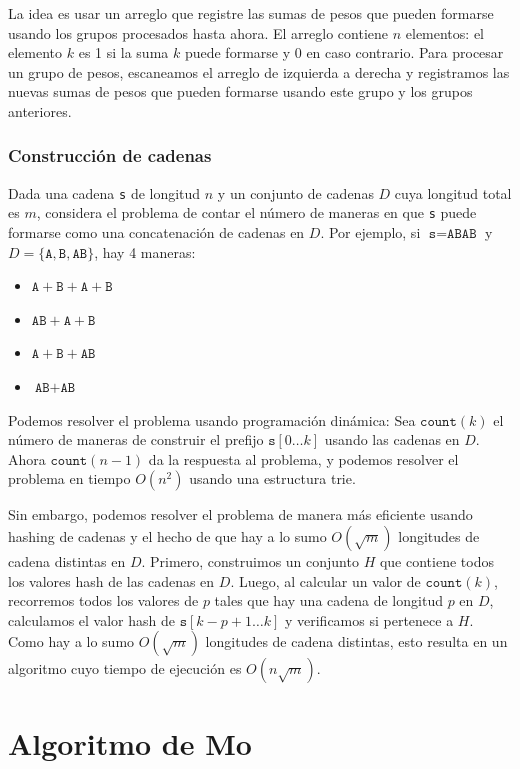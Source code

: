 La idea es usar un arreglo que registre las sumas de pesos
que pueden formarse usando los grupos procesados hasta ahora.
El arreglo contiene $n$ elementos: el elemento $k$ es 1 si la suma
$k$ puede formarse y 0 en caso contrario.
Para procesar un grupo de pesos, escaneamos el arreglo
de izquierda a derecha y registramos las nuevas sumas de pesos que
pueden formarse usando este grupo y los grupos anteriores.

\subsubsection{Construcción de cadenas}

Dada una cadena \texttt{s} de longitud $n$
y un conjunto de cadenas $D$ cuya longitud total es $m$,
considera el problema de contar el número de maneras
en que \texttt{s} puede formarse como una concatenación de cadenas en $D$.
Por ejemplo,
si $\texttt{s}=\texttt{ABAB}$ y
$D=\{\texttt{A},\texttt{B},\texttt{AB}\}$,
hay 4 maneras:

\begin{itemize}[noitemsep]
\item $\texttt{A}+\texttt{B}+\texttt{A}+\texttt{B}$
\item $\texttt{AB}+\texttt{A}+\texttt{B}$
\item $\texttt{A}+\texttt{B}+\texttt{AB}$
\item $\texttt{AB}+\texttt{AB}$
\end{itemize}

Podemos resolver el problema usando programación dinámica:
Sea $\texttt{count}(k)$ el número de maneras de construir el prefijo
$\texttt{s}[0 \ldots k]$ usando las cadenas en $D$.
Ahora $\texttt{count}(n-1)$ da la respuesta al problema,
y podemos resolver el problema en tiempo $O(n^2)$
usando una estructura trie.

Sin embargo, podemos resolver el problema de manera más eficiente
usando hashing de cadenas y el hecho de que hay
a lo sumo $O(\sqrt m)$ longitudes de cadena distintas en $D$.
Primero, construimos un conjunto $H$ que contiene todos
los valores hash de las cadenas en $D$.
Luego, al calcular un valor de $\texttt{count}(k)$,
recorremos todos los valores de $p$
tales que hay una cadena de longitud $p$ en $D$,
calculamos el valor hash de $\texttt{s}[k-p+1 \ldots k]$
y verificamos si pertenece a $H$.
Como hay a lo sumo $O(\sqrt m)$ longitudes de cadena distintas,
esto resulta en un algoritmo cuyo tiempo de ejecución es $O(n \sqrt m)$.

\section{Algoritmo de Mo}

